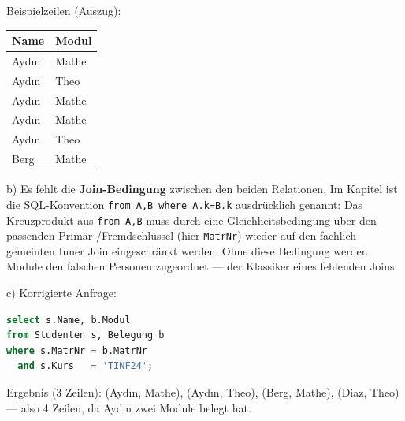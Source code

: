 \documentclass[11pt, a4paper]{article}
\begin{document}
Beispielzeilen (Auszug):



{\small
\begin{tabularx}{\linewidth}{XX}
\hline
\rowcolor{tableheadbg}
{\color{white}\textbf{Name}} & {\color{white}\textbf{Modul}} \\[2pt]
\hline
\endhead
\hline
\endfoot
Aydın & Mathe \\
Aydın & Theo \\
Aydın & Mathe \\
Aydın & Mathe \\
Aydın & Theo \\
Berg & Mathe \\
\end{tabularx}
}


b) Es fehlt die \textbf{Join-Bedingung} zwischen den beiden Relationen. Im Kapitel ist die SQL-Konvention \texttt{from A,B where A.k=B.k} ausdrücklich genannt: Das Kreuzprodukt aus \texttt{from A,B} muss durch eine Gleichheitsbedingung über den passenden Primär-/Fremdschlüssel (hier \texttt{MatrNr}) wieder auf den fachlich gemeinten Inner Join eingeschränkt werden. Ohne diese Bedingung werden Module den falschen Personen zugeordnet — der Klassiker eines fehlenden Joins.


c) Korrigierte Anfrage:


\begin{lstlisting}[language=sql]
select s.Name, b.Modul
from Studenten s, Belegung b
where s.MatrNr = b.MatrNr
  and s.Kurs   = 'TINF24';
\end{lstlisting}


Ergebnis (3 Zeilen): (Aydın, Mathe), (Aydın, Theo), (Berg, Mathe), (Diaz, Theo) — also 4 Zeilen, da Aydın zwei Module belegt hat.





\end{document}

